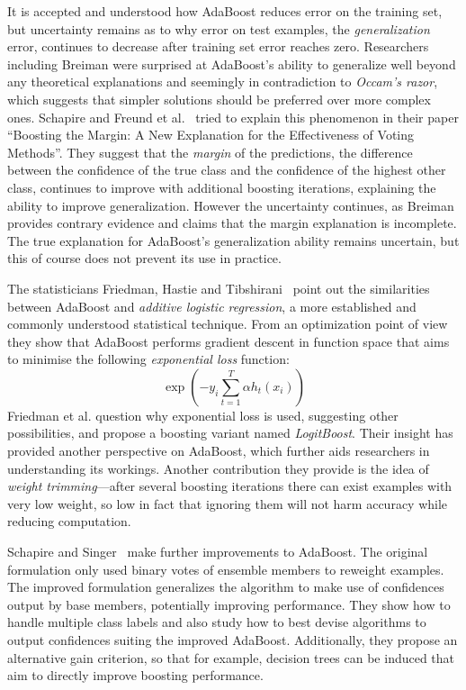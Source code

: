 It is accepted and understood how AdaBoost reduces error on the training set, but uncertainty remains as to why error on test examples, the {\em generalization} error, continues to decrease after training set error reaches zero. Researchers including Breiman were surprised at AdaBoost's ability to generalize well beyond any theoretical explanations and seemingly in contradiction to {\em Occam's razor}, which suggests that simpler solutions should be preferred over more complex ones. Schapire and Freund et al.~\cite{boostingmargin} tried to explain this phenomenon in their paper ``Boosting the Margin: A New Explanation for the Effectiveness of Voting Methods''. They suggest that the {\em margin} of the predictions, the difference between the confidence of the true class and the confidence of the highest other class, continues to improve with additional boosting iterations, explaining the ability to improve generalization. However the uncertainty continues, as Breiman~\cite{arcingresponse, breimanpredgames} provides contrary evidence and claims that the margin explanation is incomplete. The true explanation for AdaBoost's generalization ability remains uncertain, but this of course does not prevent its use in practice.

The statisticians Friedman, Hastie and Tibshirani~\cite{logitboost} point out the
similarities between AdaBoost and {\em additive logistic regression}, a
more established and commonly understood statistical technique. From an
optimization point of view they show that AdaBoost performs gradient
descent in function space that aims to minimise the following {\em
exponential loss} function:
\begin{equation} \label{eq:exploss}
\exp \left( -y_{i} \sum_{t=1}^{T} \alpha h_{t}(x_{i}) \right)
\end{equation}
Friedman et al. question why exponential loss is used, suggesting other
possibilities, and propose a boosting variant named {\em LogitBoost}. Their insight has provided another perspective on AdaBoost,
which further aids researchers in understanding its workings. Another
contribution they provide is the idea of {\em weight trimming}---after
several boosting iterations there can exist examples with very low weight,
so low in fact that ignoring them will not harm accuracy while reducing
computation.

Schapire and Singer~\cite{boostimproved} make further improvements to AdaBoost. The original formulation only used binary votes of ensemble members to
reweight examples. The improved formulation generalizes the algorithm to
make use of confidences output by base members, potentially improving
performance. They show how to handle multiple class labels and also study how to best devise algorithms to output confidences suiting the improved AdaBoost. Additionally, they propose an alternative gain criterion, so that for example, decision trees can be induced that aim to directly improve boosting performance.

